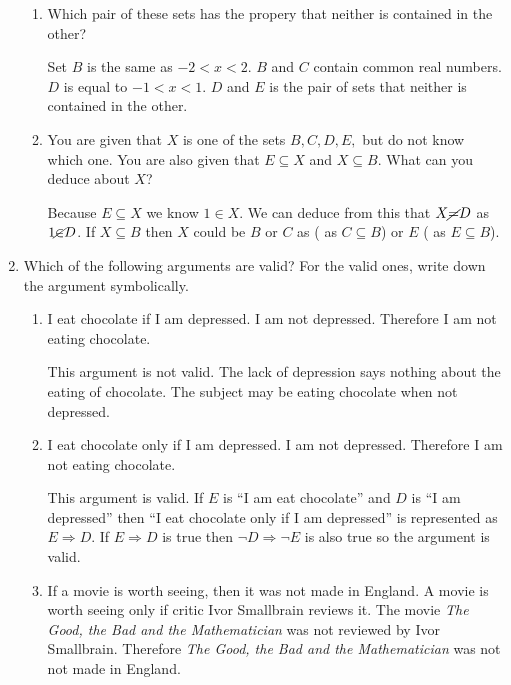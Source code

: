 \documentclass{article}
\begin{document}
\begin{enumerate}
\begin{enumerate}
			\item Which pair of these sets has the propery that neither is contained in the other?
			
				Set $B$ is the same as $-2 < x < 2$. $B$ and $C$ contain common real numbers. 
				$D$ is equal to $-1 < x < 1$. $D$ and $E$ is the pair of sets that neither is contained
				in the other.
				
			\item You are given that $X$ is one of the sets $B, C,  D, E,$ but do not know which one.
				You are also given that $E \subseteq  X$ and $X \subseteq B$. What can you deduce
				about $X$?
				
				Because $E \subseteq X$ we know $1 \in X$. We can deduce from this that $X \cancel{=} D$ as
				$1 \cancel{\in} D$. If $X \subseteq B$ then $X$ could be $B$ or $C$ as ( as $C \subseteq B$) or
				$E$ ( as $E \subseteq B$).
		\end{enumerate}
		
		\item Which of the following arguments are valid? For the valid ones, write down the argument symbolically.
		
		\begin{enumerate}
		
			\item I eat chocolate if I am depressed. I am not depressed. Therefore I am not eating chocolate.
			
				This argument is not valid. The lack of depression says nothing about the eating of chocolate.
				The subject may be eating chocolate when not depressed.
				
			\item I eat chocolate only if I am depressed. I am not depressed. Therefore I am not eating chocolate.
			
				This argument is valid. If $E$ is ``I am eat chocolate'' and $D$ is ``I am depressed'' then 
				``I eat chocolate only if I am depressed'' is represented as $E \Rightarrow D$. If $E \Rightarrow D$
				is true then $\neg D \Rightarrow \neg E$ is also true so the argument is valid.
				
			\item If a movie is worth seeing, then it was not made in England. A movie is worth seeing only if critic
				Ivor Smallbrain reviews it. The movie \emph{The Good, the Bad and the Mathematician} was not
				reviewed by Ivor Smallbrain. Therefore \emph{The Good, the Bad and the Mathematician} was not
				not made in England.
				

\end{enumerate}
\end{enumerate}
\end{document}
